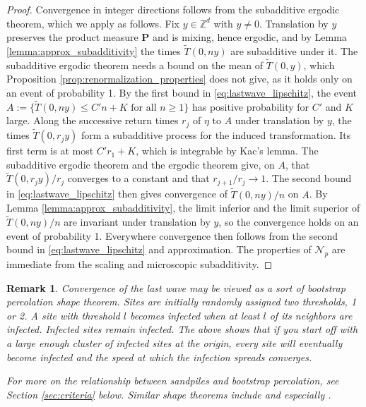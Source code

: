 \documentclass[aap]{imsart}
\newcommand{\Z}{\mathbb{Z}}
\newtheorem{remark}{Remark}
\begin{document}
\begin{proof}
	Convergence in integer directions follows from the subadditive ergodic theorem, which we apply as follows. Fix $y \in \Z^d$ with $y \neq 0$. Translation by $y$ preserves the product measure $\mathbf{P}$ and is mixing, hence ergodic, and by Lemma \ref{lemma:approx_subadditivity} the times $\tilde{T}(0,ny)$ are subadditive under it. The subadditive ergodic theorem needs a bound on the mean of $\tilde{T}(0,y)$, which Proposition \ref{prop:renormalization_properties} does not give, as it holds only on an event of probability 1. By the first bound in \eqref{eq:lastwave_lipschitz}, the event $A := \{ \tilde{T}(0,ny) \leq C' n + K \mbox{ for all } n \geq 1\}$ has positive probability for $C'$ and $K$ large. Along the successive return times $r_j$ of $\eta$ to $A$ under translation by $y$, the times $\tilde{T}(0, r_j y)$ form a subadditive process for the induced transformation. Its first term is at most $C' r_1 + K$, which is integrable by Kac's lemma. The subadditive ergodic theorem and the ergodic theorem give, on $A$, that $\tilde{T}(0, r_j y)/r_j$ converges to a constant and that $r_{j+1}/r_j \to 1$. The second bound in \eqref{eq:lastwave_lipschitz} then gives convergence of $\tilde{T}(0,ny)/n$ on $A$. By Lemma \ref{lemma:approx_subadditivity}, the limit inferior and the limit superior of $\tilde{T}(0,ny)/n$ are invariant under translation by $y$, so the convergence holds on an event of probability 1.
	Everywhere convergence then follows from the second bound in \eqref{eq:lastwave_lipschitz} and approximation. The properties of $\mathcal{N}_p$
	are immediate from the scaling and microscopic subadditivity.
\end{proof}

\begin{remark}
	Convergence of the last wave may be viewed as a sort of bootstrap percolation shape theorem. 
	Sites are initially randomly assigned two thresholds, 1 or 2. A site with threshold $l$
	becomes infected when at least $l$ of its neighbors are infected. Infected sites remain infected. 
	The above shows that if you start off with a large enough cluster of infected sites at the origin, every site will eventually become 
	infected and the speed at which the infection spreads converges. 
	
	For more on the relationship between sandpiles and bootstrap percolation, see Section \ref{sec:criteria} below. 
	Similar shape theorems include \cite{garet2012asymptotic, kesten2008shape,alves2002shape, cox1981some} and 
	especially \cite{willson1978convergence, gravner1993threshold,fey2010limiting}.
\end{remark}
\end{document}
